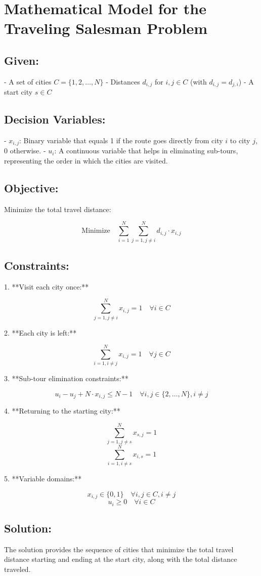 \documentclass{article}
\begin{document}
\section*{Mathematical Model for the Traveling Salesman Problem}

\subsection*{Given:}
- A set of cities \( C = \{1, 2, \ldots, N\} \)
- Distances \( d_{i,j} \) for \( i, j \in C \) (with \( d_{i,j} = d_{j,i} \))
- A start city \( s \in C \)

\subsection*{Decision Variables:}
- \( x_{i,j} \): Binary variable that equals 1 if the route goes directly from city \( i \) to city \( j \), 0 otherwise.
- \( u_i \): A continuous variable that helps in eliminating sub-tours, representing the order in which the cities are visited.

\subsection*{Objective:}
Minimize the total travel distance:

\[
\text{Minimize} \quad \sum_{i=1}^{N} \sum_{j=1, j \neq i}^{N} d_{i,j} \cdot x_{i,j}
\]

\subsection*{Constraints:}

1. **Visit each city once:**

\[
\sum_{j=1, j \neq i}^{N} x_{i,j} = 1 \quad \forall i \in C
\]

2. **Each city is left:**

\[
\sum_{i=1, i \neq j}^{N} x_{i,j} = 1 \quad \forall j \in C
\]

3. **Sub-tour elimination constraints:**

\[
u_i - u_j + N \cdot x_{i,j} \leq N-1 \quad \forall i, j \in \{2, \ldots, N\}, i \neq j
\]

4. **Returning to the starting city:**

\[
\sum_{j=1, j \neq s}^{N} x_{s,j} = 1
\]
\[
\sum_{i=1, i \neq s}^{N} x_{i,s} = 1
\]

5. **Variable domains:**

\[
x_{i,j} \in \{0, 1\} \quad \forall i, j \in C, i \neq j
\]
\[
u_i \geq 0 \quad \forall i \in C
\]

\subsection*{Solution:}
The solution provides the sequence of cities that minimize the total travel distance starting and ending at the start city, along with the total distance traveled.
\end{document}

